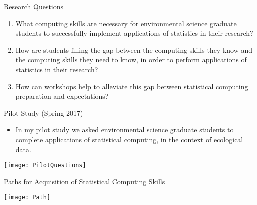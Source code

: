 \documentclass[10pt,ignorenonframetext,]{beamer}
\providecommand{\tightlist}{%
  \setlength{\itemsep}{0pt}\setlength{\parskip}{0pt}}
\begin{document}
\begin{frame}{Research Questions}

\begin{enumerate}[<+->]
\def\labelenumi{\arabic{enumi}.}
\item
  What computing skills are necessary for environmental science graduate
  students to successfully implement applications of statistics in their
  research?
\item
  How are students filling the gap between the computing skills they
  know and the computing skills they need to know, in order to perform
  applications of statistics in their research?
\item
  How can workshops help to alleviate this gap between statistical
  computing preparation and expectations?
\end{enumerate}

\end{frame}

\begin{frame}{Pilot Study (Spring 2017)}

\begin{itemize}[<+->]
\tightlist
\item
  In my pilot study we asked environmental science graduate students to
  complete applications of statistical computing, in the context of
  ecological data.
\end{itemize}

\begin{center}\texttt{[image: PilotQuestions]} \end{center}

\end{frame}

\begin{frame}{Paths for Acquisition of Statistical Computing Skills}

\begin{center}\texttt{[image: Path]} \end{center}

\end{frame}
\end{document}
